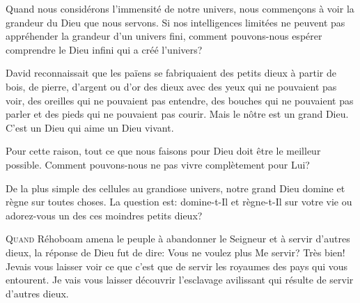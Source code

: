 Quand nous considérons l'immensité de notre univers,
 nous commen\c{c}ons à voir la grandeur du Dieu que nous servons.
 Si nos intelligences limitées ne peuvent pas appréhender
 la grandeur d'un univers fini, comment pouvons-nous espérer
 comprendre le Dieu infini qui a créé l'univers? 

David reconnaissait que les païens se fabriquaient des petits dieux
 à partir de bois, de pierre, d'argent ou d'or \ocadr des dieux avec des yeux
 qui ne pouvaient pas voir, des oreilles qui ne pouvaient pas entendre,
 des bouches qui ne pouvaient pas parler et des pieds
 qui ne pouvaient pas courir. Mais le nôtre est un grand Dieu.
 C'est un Dieu qui aime \ocadr un Dieu vivant. 


Pour cette raison, tout ce que nous faisons pour Dieu
 doit être le meilleur possible.
 Comment pouvons-nous ne pas vivre complètement pour Lui? 

De la plus simple des cellules au grandiose univers,
 notre grand Dieu domine et règne sur toutes choses.
 La question est: domine-t-Il et règne-t-Il sur votre vie
 \ocadr ou adorez-vous un des ces moindres petits dieux? 

\dvrule







\lettrine{Q}{uand} Réhoboam amena le peuple à abandonner le Seigneur
 et à servir d'autres dieux, la réponse de Dieu fut de dire:
 \Og Vous ne voulez plus Me servir? Très bien!
 Je\linebreak vais vous laisser voir ce que c'est que de servir les royaumes
 des pays qui vous entourent. Je vais vous laisser découvrir l'esclavage
 avilissant qui résulte de servir d'autres dieux. \Fg{}



